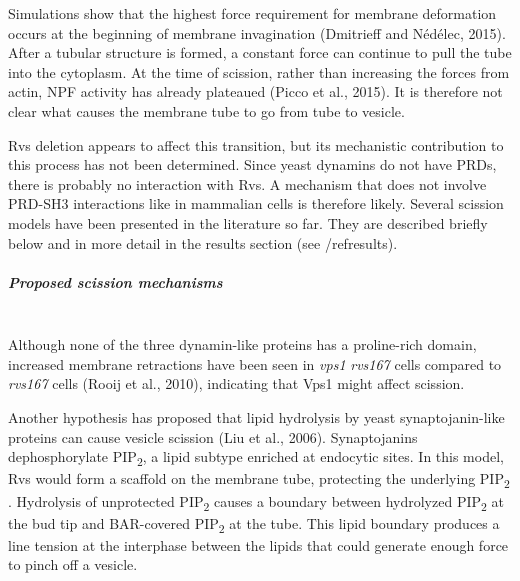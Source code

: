 Simulations show that the highest force requirement for membrane deformation occurs at the beginning of membrane invagination (Dmitrieff and Nédélec, 2015). After a tubular structure is formed, a constant force can continue to pull the tube into the cytoplasm. At the time of scission, rather than increasing the forces from actin, NPF activity has already plateaued (Picco et al., 2015). It is therefore not clear what causes the membrane tube to go from tube to vesicle.  

Rvs deletion appears to affect this transition, but its mechanistic contribution to this process has not been determined. Since yeast dynamins do not have PRDs, there is probably no interaction with Rvs. A mechanism that does not involve PRD-SH3 interactions like in mammalian cells is therefore likely. Several scission models have been presented in the literature so far. They are described briefly below and in more detail in the results section (see /ref{results}). 



		
			\subparagraph{Proposed scission mechanisms}
			\mbox{}\\
			Although none of the three dynamin-like proteins has a proline-rich domain, increased membrane retractions have been seen in \textit{vps1\textDelta} \textit{rvs167\textDelta}  cells compared to \textit{rvs167\textDelta}  cells (Rooij et al., 2010), indicating that Vps1 might affect scission. 

			\vspace{5mm}
Another hypothesis has proposed that lipid hydrolysis by yeast synaptojanin-like proteins can cause vesicle scission (Liu et al., 2006). Synaptojanins dephosphorylate 	PIP\textsubscript{2}, a lipid subtype enriched at endocytic sites. In this model, Rvs would form a scaffold on the membrane tube, protecting the underlying 	PIP\textsubscript{2} . Hydrolysis of unprotected 	PIP\textsubscript{2} causes a boundary between hydrolyzed 	PIP\textsubscript{2} at the bud tip and BAR-covered 	PIP\textsubscript{2} at the tube. This lipid boundary produces a line tension at the interphase between the lipids that could generate enough force to pinch off a vesicle. 

